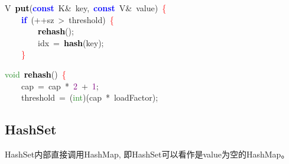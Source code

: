 \begin{center}\begin{minipage}{120mm}
\noindent
\mbox{}\textcolor{TealBlue}{V}\ \textbf{\textcolor{Black}{put}}\textcolor{BrickRed}{(}\textbf{\textcolor{Blue}{const}}\ K\textcolor{BrickRed}{\&}\ key\textcolor{BrickRed}{,}\ \textbf{\textcolor{Blue}{const}}\ V\textcolor{BrickRed}{\&}\ value\textcolor{BrickRed}{)}\ \textcolor{Red}{\{} \\
\mbox{}\ \ \ \ \textbf{\textcolor{Blue}{if}}\ \textcolor{BrickRed}{(++}sz\ \textcolor{BrickRed}{\textgreater{}}\ threshold\textcolor{BrickRed}{)}\ \textcolor{Red}{\{} \\
\mbox{}\ \ \ \ \ \ \ \ \textbf{\textcolor{Black}{rehash}}\textcolor{BrickRed}{();} \\
\mbox{}\ \ \ \ \ \ \ \ idx\ \textcolor{BrickRed}{=}\ \textbf{\textcolor{Black}{hash}}\textcolor{BrickRed}{(}key\textcolor{BrickRed}{);} \\
\mbox{}\ \ \ \ \textcolor{Red}{\}} \\
\end{minipage}\end{center}

\begin{center}\begin{minipage}{120mm}
\noindent
\mbox{}\textcolor{ForestGreen}{void}\ \textbf{\textcolor{Black}{rehash}}\textcolor{BrickRed}{()}\ \textcolor{Red}{\{} \\
\mbox{}\ \ \ \ cap\ \textcolor{BrickRed}{=}\ cap\ \textcolor{BrickRed}{*}\ \textcolor{Purple}{2}\ \textcolor{BrickRed}{+}\ \textcolor{Purple}{1}\textcolor{BrickRed}{;} \\
\mbox{}\ \ \ \ threshold\ \textcolor{BrickRed}{=}\ \textcolor{BrickRed}{(}\textcolor{ForestGreen}{int}\textcolor{BrickRed}{)(}cap\ \textcolor{BrickRed}{*}\ loadFactor\textcolor{BrickRed}{);} \\
\end{minipage}\end{center}

\subsection{HashSet}
HashSet内部直接调用HashMap, 即HashSet可以看作是value为空的HashMap。


